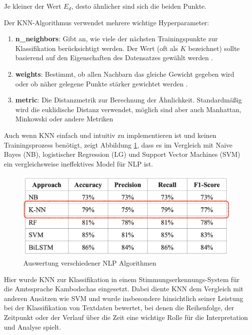 Je kleiner der Wert \( E_d \), desto ähnlicher sind sich die beiden Punkte.

Der KNN-Algorithmus verwendet mehrere wichtige Hyperparameter:

\begin{enumerate}
    \item \textbf{n\_neighbors}: Gibt an, wie viele der nächsten Trainingspunkte zur Klassifikation berücksichtigt werden. 
    Der Wert (oft als \( K \) bezeichnet) sollte basierend auf den Eigenschaften des Datensatzes gewählt werden \cite{Verma:2024aa, aslam2022}.

    \item \textbf{weights}: Bestimmt, ob allen Nachbarn das gleiche Gewicht gegeben wird oder ob näher gelegene Punkte stärker 
    gewichtet werden \cite{knnparams2024}.

    \item \textbf{metric}: Die Distanzmetrik zur Berechnung der Ähnlichkeit. Standardmäßig wird die euklidische Distanz verwendet, 
    möglich sind aber auch Manhattan, Minkowski oder andere Metriken \cite{aslam2022}
\end{enumerate}

Auch wenn KNN einfach und intuitiv zu implementieren ist und keinen Trainingsprozess benötigt, zeigt Abbildung \ref{fig:nlp_models}, 
dass es im Vergleich mit Naive Bayes (NB), logistischer Regression (LG) und Support Vector Machines (SVM) ein vergleichsweise ineffektives Model 
für NLP ist.

\begin{figure}[htbp]
    \begin{center}
        \includegraphics[scale=0.4]{static/vgl_svm_knn_etc.png}
        \caption{\label{fig:nlp_models} Auswertung verschiedener NLP Algorithmen \cite{prom2024}}
    \end{center}
\end{figure}

Hier wurde KNN zur Klassifikation in einem Stimmungserkennungs-System für die Amtssprache Kambodschas eingesetzt. 
Dabei diente KNN dem Vergleich mit anderen Ansätzen wie SVM und wurde insbesondere hinsichtlich seiner Leistung bei der 
Klassifikation von Textdaten bewertet, bei denen die Reihenfolge, der Zeitpunkt oder der Verlauf über die Zeit eine wichtige Rolle 
für die Interpretation und Analyse spielt.

